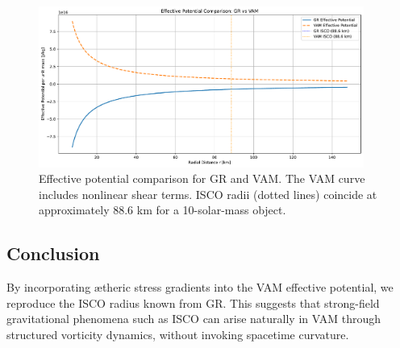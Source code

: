 \begin{figure}[H]
    \centering
    \includegraphics[width=0.95\textwidth]{VAM_GR_ISCO_Benchmark}
    \caption{Effective potential comparison for GR and VAM. The VAM curve includes nonlinear shear terms. ISCO radii (dotted lines) coincide at approximately 88.6 km for a 10-solar-mass object.}\label{fig:figure}
\end{figure}

\subsection{Conclusion}

By incorporating ætheric stress gradients into the VAM effective potential, we reproduce the ISCO radius known from GR. This suggests that strong-field gravitational phenomena such as ISCO can arise naturally in VAM through structured vorticity dynamics, without invoking spacetime curvature.

